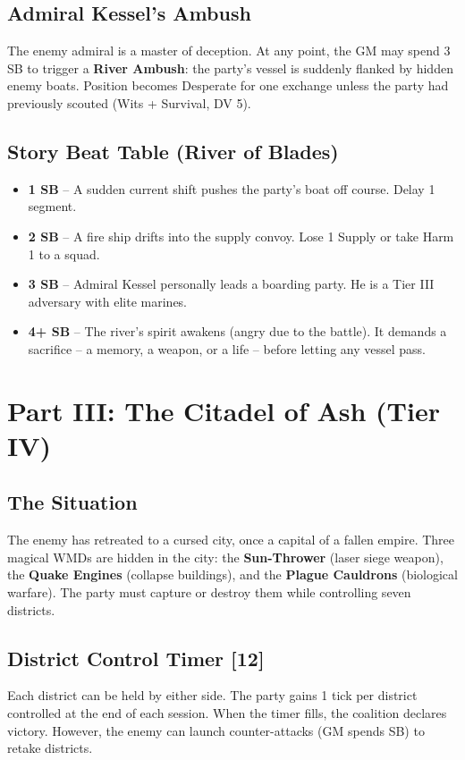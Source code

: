 \documentclass[11pt]{article}
\begin{document}
\subsection*{Admiral Kessel's Ambush}
The enemy admiral is a master of deception. At any point, the GM may spend 3 SB to trigger a \textbf{River Ambush}: the party's vessel is suddenly flanked by hidden enemy boats. Position becomes Desperate for one exchange unless the party had previously scouted (Wits + Survival, DV 5).

\subsection*{Story Beat Table (River of Blades)}
\begin{itemize}
\item \textbf{1 SB} -- A sudden current shift pushes the party's boat off course. Delay 1 segment.
\item \textbf{2 SB} -- A fire ship drifts into the supply convoy. Lose 1 Supply or take Harm 1 to a squad.
\item \textbf{3 SB} -- Admiral Kessel personally leads a boarding party. He is a Tier III adversary with elite marines.
\item \textbf{4+ SB} -- The river's spirit awakens (angry due to the battle). It demands a sacrifice -- a memory, a weapon, or a life -- before letting any vessel pass.
\end{itemize}

\section*{Part III: The Citadel of Ash (Tier IV)}

\subsection*{The Situation}
The enemy has retreated to a cursed city, once a capital of a fallen empire. Three magical WMDs are hidden in the city: the \textbf{Sun-Thrower} (laser siege weapon), the \textbf{Quake Engines} (collapse buildings), and the \textbf{Plague Cauldrons} (biological warfare). The party must capture or destroy them while controlling seven districts.

\subsection*{District Control Timer [12]}
Each district can be held by either side. The party gains 1 tick per district controlled at the end of each session. When the timer fills, the coalition declares victory. However, the enemy can launch counter-attacks (GM spends SB) to retake districts.
\end{document}
